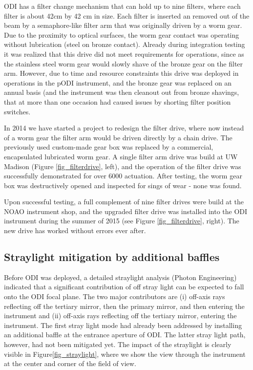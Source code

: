 \documentclass[]{spieman}
\begin{document}
ODI has a filter change mechanism that can hold up to nine filters, where each
filter is about 42cm by 42 cm in size. Each filter is inserted an removed out of
the beam by a semaphore-like filter arm that was originally driven by a worm
gear\cite{Muller2008}. Due to the proximity to optical surfaces, the worm gear
contact was operating without lubrication (steel on bronze contact). Already
during integration testing it was realized that this drive did not meet
requirements for operations, since as the stainless steel worm gear would slowly
shave of the bronze gear on the filter arm. However, due to time and resource
constraints this drive was deployed in operations in the pODI instrument, and
the bronze gear was replaced on an annual basis (and the instrument was then
cleanout out from bronze shavings, that at more than one occasion had caused
issues by shorting filter position switches.


In 2014 we have started a project to redesign the filter drive, where now 
instead of a worm gear the filter arm would be driven directly by a chain 
drive. The previously used custom-made gear box was replaced by a commercial, 
encapsulated lubricated worm gear. A single filter arm drive was build at UW 
Madison (Figure \ref{fig_filterdrive}, left), and the operation of the filter 
drive was successfully demonstrated for over 6000 actuation. After testing, the 
worm gear box was destructively opened and inspected for sings of wear - none 
was found. 
 
Upon successful testing, a full complement of nine filter drives were build at 
the NOAO instrument shop, and the upgraded filter drive was installed into the 
ODI instrument during the summer of 2015 (see Figure \ref{fig_filterdrive}, 
right). The new drive has worked without  errors ever after. 



\subsection{Straylight mitigation by additional baffles}

Before ODI was deployed, a detailed straylight analysis (Photon Engineering)
indicated that a significant contribution of off stray light can be expected to
fall onto the ODI focal plane. The two major contributors are (i) off-axis rays
reflecting off the tertiary mirror, then the primary mirror, and then entering
the instrument and (ii) off-axis rays reflecting off the tertiary mirror,
entering the instrument. The first stray light mode had already been addressed
by installing an additional baffle at the entrance aperture of ODI. The latter
stray light path, however, had not been mitigated yet. The impact of the
straylight is clearly visible in Figure\ref{fig_straylight}, where we show the
view through the instrument at the center and corner of the field of view.
\end{document}
